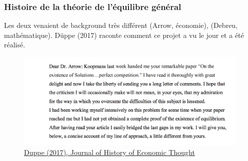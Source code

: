\documentclass[handout]{beamer}
\begin{document}
\begin{frame}\frametitle{Histoire de la théorie de l'équilibre général}

Les deux venaient de background très différent (Arrow, économie), (Debreu, mathématique). Düppe (2017) raconte comment ce projet a vu le jour et a été réalisé.  

\begin{figure}
\centering
\includegraphics[scale=0.35]{invitation.png}
\caption{\href{https://www.cambridge.org/core/journals/journal-of-the-history-of-economic-thought/article/div-classtitlearrow-and-debreu-de-homogenizeddiv/761E76D5A52C948615066F502277D9DD}{Duppe (2017), Journal of History of Economic Thought}}
\end{figure}

\end{frame}
\end{document}

